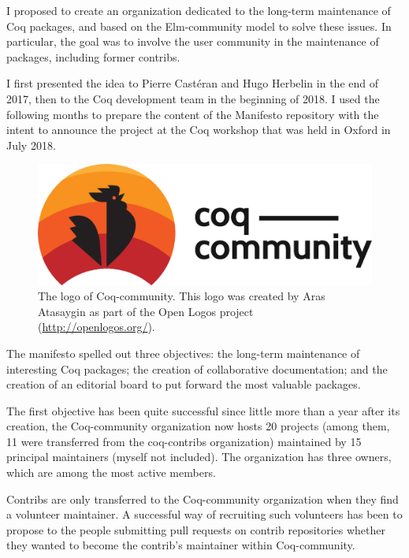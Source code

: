 \label{sec:coq-community}

I proposed to create an organization dedicated to the long-term maintenance of Coq packages, and based on the Elm-community model to solve these issues.
In particular, the goal was to involve the user community in the maintenance of packages, including former contribs.

I first presented the idea to Pierre Cast\'eran and Hugo Herbelin in the end of 2017, then to the Coq development team in the beginning of 2018.
I used the following months to prepare the content of the Manifesto repository with the intent to announce the project at the Coq workshop that was held in Oxford in July 2018.

\begin{figure}
	\begin{center}
		\includegraphics[width=15cm]{logo.eps}
		\caption{
			The logo of Coq-community.
			This logo was created by Aras Atasaygin as part of the Open Logos project (\url{http://openlogos.org/}).
		}
	\end{center}
\end{figure}

The manifesto spelled out three objectives: the long-term maintenance of interesting Coq packages; the creation of collaborative documentation; and the creation of an editorial board to put forward the most valuable packages.

The first objective has been quite successful since little more than a year after its creation, the Coq-community organization now hosts 20 projects (among them, 11 were transferred from the coq-contribs organization) maintained by 15 principal maintainers (myself not included).
The organization has three owners, which are among the most active members.

Contribs are only transferred to the Coq-community organization when they find a volunteer maintainer.
A successful way of recruiting such volunteers has been to propose to the people submitting pull requests on contrib repositories whether they wanted to become the contrib's maintainer within Coq-community.

